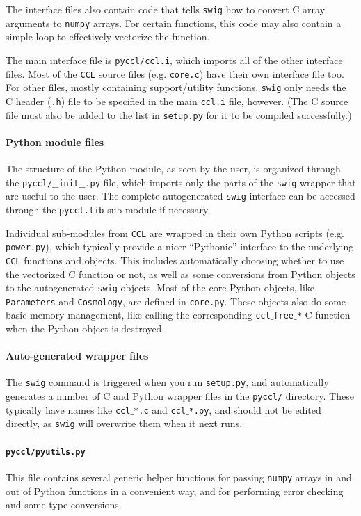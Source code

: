 \documentclass[\docopts]{\docclass}
\newcommand{\ccl}{{\tt CCL}\xspace}
\begin{document}
The interface files also contain code that tells {\tt swig} how to convert C array arguments to {\tt numpy} arrays. For certain functions, this code may also contain a simple loop to effectively vectorize the function.

The main interface file is {\tt pyccl/ccl.i}, which imports all of the other interface files. Most of the \ccl source files (e.g. {\tt core.c}) have their own interface file too. For other files, mostly containing support/utility functions, {\tt swig} only needs the C header ({\tt .h}) file to be specified in the main {\tt ccl.i} file, however. (The C source file must also be added to the list in {\tt setup.py} for it to be compiled successfully.)

\paragraph{Python module files} The structure of the Python module, as seen by the user, is organized through the {\tt pyccl/$\_$$\_$init$\_$$\_$.py} file, which imports only the parts of the {\tt swig} wrapper that are useful to the user. The complete autogenerated {\tt swig} interface can be accessed through the {\tt pyccl.lib} sub-module if necessary.

Individual sub-modules from \ccl are wrapped in their own Python scripts (e.g. {\tt power.py}), which typically provide a nicer ``Pythonic'' interface to the underlying \ccl functions and objects. This includes automatically choosing whether to use the vectorized C function or not, as well as some conversions from Python objects to the autogenerated {\tt swig} objects. Most of the core Python objects, like {\tt Parameters} and {\tt Cosmology}, are defined in {\tt core.py}. These objects also do some basic memory management, like calling the corresponding {\tt ccl$\_$free$\_$*} C function when the Python object is destroyed.

\paragraph{Auto-generated wrapper files} The {\tt swig} command is triggered when you run {\tt setup.py}, and automatically generates a number of C and Python wrapper files in the {\tt pyccl/} directory. These typically have names like {\tt ccl$\_$*.c} and {\tt ccl$\_$*.py}, and should not be edited directly, as {\tt swig} will overwrite them when it next runs.

\paragraph{{\tt pyccl/pyutils.py}} This file contains several generic helper functions for passing {\tt numpy} arrays in and out of Python functions in a convenient way, and for performing error checking and some type conversions.
\end{document}
